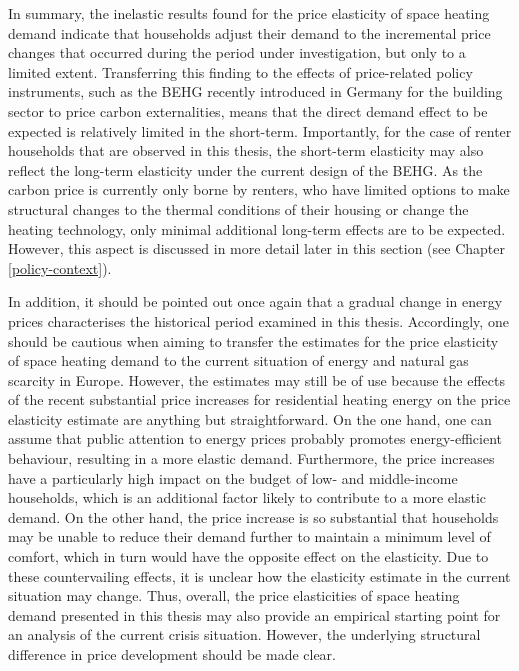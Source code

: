\documentclass[12pt,twoside]{reedthesis}
\begin{document}
In summary, the inelastic results found for the price elasticity of space heating demand indicate that households adjust their demand to the incremental price changes that occurred during the period under investigation, but only to a limited extent. Transferring this finding to the effects of price-related policy instruments, such as the BEHG recently introduced in Germany for the building sector to price carbon externalities, means that the direct demand effect to be expected is relatively limited in the short-term. Importantly, for the case of renter households that are observed in this thesis, the short-term elasticity may also reflect the long-term elasticity under the current design of the BEHG. As the carbon price is currently only borne by renters, who have limited options to make structural changes to the thermal conditions of their housing or change the heating technology, only minimal additional long-term effects are to be expected. However, this aspect is discussed in more detail later in this section (see Chapter \ref{policy-context}).

In addition, it should be pointed out once again that a gradual change in energy prices characterises the historical period examined in this thesis. Accordingly, one should be cautious when aiming to transfer the estimates for the price elasticity of space heating demand to the current situation of energy and natural gas scarcity in Europe. However, the estimates may still be of use because the effects of the recent substantial price increases for residential heating energy on the price elasticity estimate are anything but straightforward. On the one hand, one can assume that public attention to energy prices probably promotes energy-efficient behaviour, resulting in a more elastic demand. Furthermore, the price increases have a particularly high impact on the budget of low- and middle-income households, which is an additional factor likely to contribute to a more elastic demand. On the other hand, the price increase is so substantial that households may be unable to reduce their demand further to maintain a minimum level of comfort, which in turn would have the opposite effect on the elasticity. Due to these countervailing effects, it is unclear how the elasticity estimate in the current situation may change. Thus, overall, the price elasticities of space heating demand presented in this thesis may also provide an empirical starting point for an analysis of the current crisis situation. However, the underlying structural difference in price development should be made clear.
\end{document}

